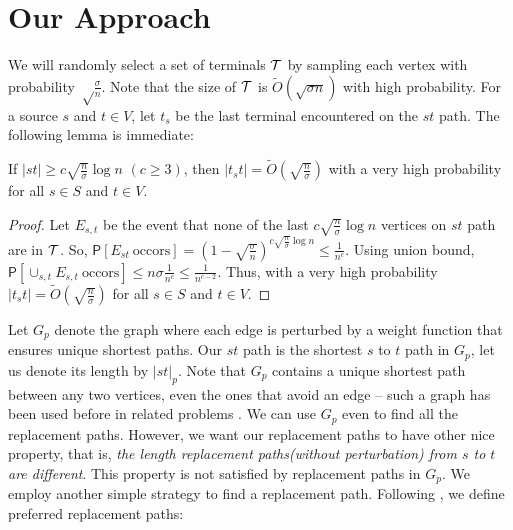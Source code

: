 \iflong
\else
\vspace{-2mm}
\fi
\section{Our Approach}

\noindent  We will randomly select a set of terminals $\mathcal{T}$ by sampling
each vertex with probability $\sqrt\frac{\sigma}{n}$. Note
that the size of $\mathcal{T}$ is $\tilde O(\sqrt {\sigma n})$ with high probability.
For a source $s$ and $t \in V$, let $t_s$ be the last terminal encountered on the $st$ path.
The following lemma is immediate:
\begin{lemma}
\label{lem:lower}
If $|st| \ge c \sqrt{\frac{n}{\sigma}} \log n$ $(c \ge 3)$,
then $|t_st| = \tilde O(\sqrt{\frac{n}{\sigma}})$ with a
very high probability for all $s \in S$ and $t \in V$.
\end{lemma}

\iflong
  \begin{proof}
  Let $E_{s,t}$ be the event  that none of the  last $c \sqrt{\frac{n}{\sigma}} \log n$
  vertices on $st$ path are in $\mathcal{T}$.  So,
  $\mathsf{P}[E_{st}\ \text{occors} ] = (1 - \sqrt{\frac{\sigma}{n}})^{c \sqrt{\frac{n}{\sigma}}
  \log n} \le \frac{1}{n^c}.$ Using union bound, $\mathsf{P}[ \cup_{s,t} E_{s,t}  ~\text{occors}] \le n \sigma \frac{1}{n^c} \le \frac{1}{n^{c-2}}$.
  Thus, with a very high probability  $|t_st| = \tilde O(\sqrt{\frac{n}{\sigma}})$  for all $s \in S$ and $t \in V$.


  \end{proof}
\fi

Let $G_p$ denote the graph where each edge is perturbed by a weight function that ensures unique shortest paths. Our
$st$ path is the shortest $s$ to $t$ path in $G_p$, let
us denote its  length by $|st|_p$. Note that $G_p$ contains a unique shortest path between any two vertices,
even the ones that avoid an edge -- such a graph has been used before in related problems
\cite{BernsteinK09,ParterP13,HershbergerS01}. We can use $G_p$ even to find all the
replacement paths. However, we want our replacement
paths to have  other nice property, that is,
{\em the length replacement paths(without perturbation) from $s$ to $t$ are different}.
This property is not satisfied by replacement paths in $G_p$. We employ another
simple strategy to find a replacement path. Following \cite{GuptaK17}, we
define preferred replacement paths:


